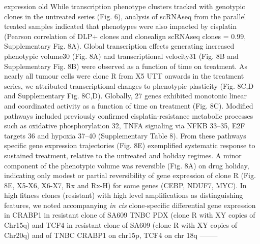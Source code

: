 \fitness expression old
While transcription phenotype clusters tracked with genotypic clones in the untreated series     (Fig. 6), analysis of scRNAseq from the parallel treated samples indicated that phenotypes were     also impacted by cisplatin (Pearson correlation of DLP+ clones and clonealign  scRNAseq      clones  =  0.99,   Supplementary  Fig.  8A).  Global  transcription  effects  generating  increased phenotypic  volume30  (Fig.  8A)  and  transcriptional  velocity31  (Fig.  8B  and  Supplementary     Fig.  8B)  were  observed  as  a  function  of  time  on  treatment.	As  nearly  all  tumour  cells      were  clone  R  from  X5  UTT   onwards  in  the  treatment  series,  we  attributed  transcriptional     changes to phenotypic plasticity (Fig. 8C,D and Supplementary Fig. 8C,D). Globally, 27 genes     exhibited monotonic linear and coordinated activity as a function of time on treatment (Fig. 8C).   Modified pathways included previously confirmed cisplatin-resistance metabolic processes such      as oxidative phosphorylation 32, TNFA signaling via NFKB 33–35, E2F targets 36 and hypoxia 37–40     (Supplementary Table 8).  From these pathways specific gene expression trajectories (Fig. 8E)     exemplified systematic response to sustained treatment, relative to the untreated and holiday      regimes. A minor component of the phenotypic volume was reversible (Fig. 8A) on drug holiday,     indicating only modest or partial reversibility of gene expression of clone R (Fig. 8E, X5-X6, X6-X7, Rx and Rx-H) for some genes (CEBP, NDUF7, MYC).
In high fitness clones (resistant) with high level amplifications as distinguishing features, we noted accompanying \textit{in cis} clone-specific differential gene expression in CRABP1 in resistant clone of SA609 TNBC PDX (clone R with XY copies of Chr15q) and  TCF4 in resistant clone of SA609 (clone R with XY copies of Chr20q) and of TNBC
CRABP1 on chr15p, TCF4 on chr 18q --------


